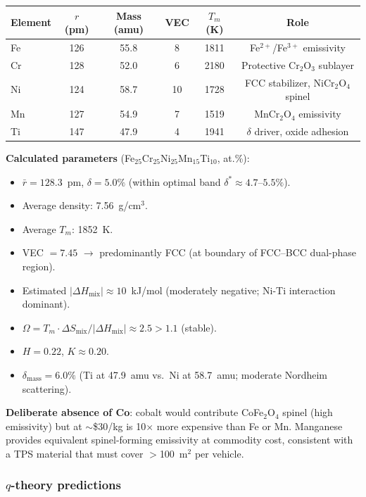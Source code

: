 \documentclass[12pt,letterpaper]{article}
\theoremstyle{definition}
\begin{document}
\begin{center}
\begin{tabular}{@{}lccccc@{}}
\toprule
Element & $r$ (pm) & Mass (amu) & VEC & $T_m$ (K) & Role \\
\midrule
Fe & 126 & 55.8 & 8 & 1811 & Fe$^{2+}$/Fe$^{3+}$ emissivity \\
Cr & 128 & 52.0 & 6 & 2180 & Protective Cr$_2$O$_3$ sublayer \\
Ni & 124 & 58.7 & 10 & 1728 & FCC stabilizer, NiCr$_2$O$_4$ spinel \\
Mn & 127 & 54.9 & 7 & 1519 & MnCr$_2$O$_4$ emissivity \\
Ti & 147 & 47.9 & 4 & 1941 & $\delta$ driver, oxide adhesion \\
\bottomrule
\end{tabular}
\end{center}

\textbf{Calculated parameters} (Fe$_{25}$Cr$_{25}$Ni$_{25}$Mn$_{15}$Ti$_{10}$, at.\%):
\begin{itemize}
  \item $\bar{r} = 128.3$~pm, \quad $\delta = 5.0\%$ \quad (within optimal band $\delta^* \approx 4.7$--$5.5\%$).
  \item Average density: 7.56~g/cm$^3$.
  \item Average $T_m$: 1852~K.
  \item VEC $= 7.45$ $\to$ predominantly FCC (at boundary of FCC--BCC dual-phase region).
  \item Estimated $|\Delta H_{\mathrm{mix}}| \approx 10$~kJ/mol (moderately negative; Ni-Ti interaction dominant).
  \item $\Omega = T_m \cdot \Delta S_{\mathrm{mix}} / |\Delta H_{\mathrm{mix}}| \approx 2.5 > 1.1$ \quad (stable).
  \item $H = 0.22$, \quad $K \approx 0.20$.
  \item $\delta_{\mathrm{mass}} = 6.0\%$ \quad (Ti at 47.9~amu vs.\ Ni at 58.7~amu; moderate Nordheim scattering).
\end{itemize}

\textbf{Deliberate absence of Co}: cobalt would contribute CoFe$_2$O$_4$ spinel (high emissivity) but at $\sim$\$30/kg is 10$\times$ more expensive than Fe or Mn.  Manganese provides equivalent spinel-forming emissivity at commodity cost, consistent with a TPS material that must cover $>$100~m$^2$ per vehicle.

\subsubsection{$q$-theory predictions}
\end{document}
